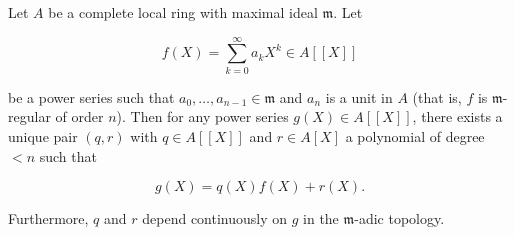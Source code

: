 Let $A$ be a complete local ring with maximal ideal $\mathfrak{m}$. Let

$$f(X) = \sum_{k=0}^{\infty} a_k X^k \in A[[X]]$$

be a power series such that $a_0, \dots, a_{n-1} \in \mathfrak{m}$ and $a_n$ is a unit in $A$ (that is, $f$ is $\mathfrak{m}$-regular of order $n$). Then for any power series $g(X) \in A[[X]]$, there exists a unique pair $(q, r)$ with $q \in A[[X]]$ and $r \in A[X]$ a polynomial of degree $< n$ such that

$$g(X) = q(X) f(X) + r(X).$$

Furthermore, $q$ and $r$ depend continuously on $g$ in the $\mathfrak{m}$-adic topology.
